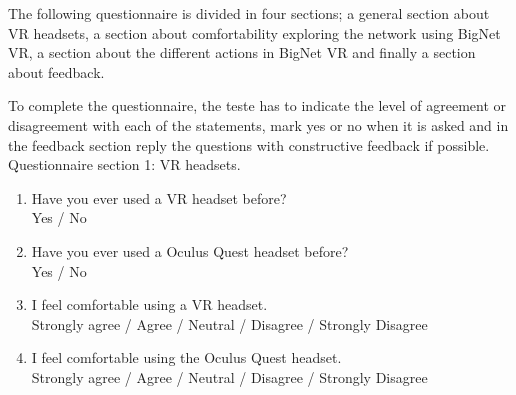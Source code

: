 The following questionnaire is divided in four sections; a general section about VR headsets, a section about comfortability exploring the network using BigNet VR, a section about the different actions in BigNet VR and finally a section about feedback.

To complete the questionnaire, the teste has to indicate the level of agreement or disagreement with each of the  statements, mark yes or no when it is asked and in the feedback section reply the questions with constructive feedback if possible.\\

Questionnaire section 1: VR headsets.
\begin{enumerate}
  \item Have you ever used a VR headset before?\\
  Yes / No

  \item Have you ever used a Oculus Quest headset before?\\
  Yes / No

  \item I feel comfortable using a VR headset.\\
  Strongly agree / Agree / Neutral / Disagree / Strongly Disagree

  \item I feel comfortable using the Oculus Quest headset.\\
  Strongly agree / Agree / Neutral / Disagree / Strongly Disagree\\
\end{enumerate}

